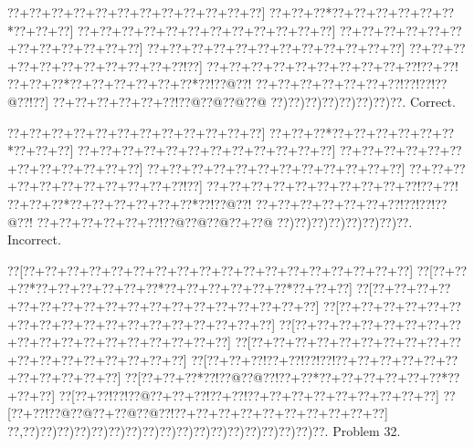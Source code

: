 \documentclass[a5paper]{article}
\begin{document}
\begin{center}
{\goo
\0??+\0??+\0??+\0??+\0??+\0??+\0??+\0??+\0??+\0??+\0??+\0??]
\0??+\0??+\0??*\0??+\0??+\0??+\0??+\0??+\0??*\0??+\0??+\0??]
\0??+\0??+\0??+\0??+\0??+\0??+\0??+\0??+\0??+\0??+\0??+\0??]
\0??+\0??+\0??+\0??+\0??+\0??+\0??+\0??+\0??+\0??+\0??+\0??]
\0??+\0??+\0??+\0??+\0??+\0??+\0??+\0??+\0??+\0??+\0??+\0??]
\0??+\0??+\0??+\0??+\0??+\0??+\0??+\0??+\0??+\0??+\0??!\0??]
\0??+\0??+\0??+\0??+\0??+\0??+\0??+\0??+\0??+\0??!\0??+\0??!
\0??+\0??+\0??*\0??+\0??+\0??+\0??+\0??+\0??*\0??!\0??@\0??!
\0??+\0??+\0??+\0??+\0??+\0??+\0??!\0??!\0??!\0??@\0??!\0??]
\0??+\0??+\0??+\0??+\0??+\0??!\0??@\0??@\0??@\0??@
\0??)\0??)\0??)\0??)\0??)\0??)\0??)\0??.
}
Correct. 

\end{center}
\begin{center}
{\goo
\0??+\0??+\0??+\0??+\0??+\0??+\0??+\0??+\0??+\0??+\0??+\0??]
\0??+\0??+\0??*\0??+\0??+\0??+\0??+\0??+\0??*\0??+\0??+\0??]
\0??+\0??+\0??+\0??+\0??+\0??+\0??+\0??+\0??+\0??+\0??+\0??]
\0??+\0??+\0??+\0??+\0??+\0??+\0??+\0??+\0??+\0??+\0??+\0??]
\0??+\0??+\0??+\0??+\0??+\0??+\0??+\0??+\0??+\0??+\0??+\0??]
\0??+\0??+\0??+\0??+\0??+\0??+\0??+\0??+\0??+\0??+\0??!\0??]
\0??+\0??+\0??+\0??+\0??+\0??+\0??+\0??+\0??+\0??!\0??+\0??!
\0??+\0??+\0??*\0??+\0??+\0??+\0??+\0??+\0??*\0??!\0??@\0??!
\0??+\0??+\0??+\0??+\0??+\0??+\0??!\0??!\0??!\0??@\0??!
\0??+\0??+\0??+\0??+\0??+\0??!\0??@\0??@\0??@\0??+\0??@
\0??)\0??)\0??)\0??)\0??)\0??)\0??)\0??.
}
Incorrect. 

\end{center}
\newpage
\begin{center}
{\goo
\0??[\0??+\0??+\0??+\0??+\0??+\0??+\0??+\0??+\0??+\0??+\0??+\0??+\0??+\0??+\0??+\0??+\0??+\0??]
\0??[\0??+\0??+\0??*\0??+\0??+\0??+\0??+\0??+\0??*\0??+\0??+\0??+\0??+\0??+\0??*\0??+\0??+\0??]
\0??[\0??+\0??+\0??+\0??+\0??+\0??+\0??+\0??+\0??+\0??+\0??+\0??+\0??+\0??+\0??+\0??+\0??+\0??]
\0??[\0??+\0??+\0??+\0??+\0??+\0??+\0??+\0??+\0??+\0??+\0??+\0??+\0??+\0??+\0??+\0??+\0??+\0??]
\0??[\0??+\0??+\0??+\0??+\0??+\0??+\0??+\0??+\0??+\0??+\0??+\0??+\0??+\0??+\0??+\0??+\0??+\0??]
\0??[\0??+\0??+\0??+\0??+\0??+\0??+\0??+\0??+\0??+\0??+\0??+\0??+\0??+\0??+\0??+\0??+\0??+\0??]
\0??[\0??+\0??+\0??!\0??+\0??!\0??!\0??!\0??+\0??+\0??+\0??+\0??+\0??+\0??+\0??+\0??+\0??+\0??]
\0??[\0??+\0??+\0??*\0??!\0??@\0??@\0??!\0??+\0??*\0??+\0??+\0??+\0??+\0??+\0??*\0??+\0??+\0??]
\0??[\0??+\0??!\0??!\0??@\0??+\0??+\0??!\0??+\0??!\0??+\0??+\0??+\0??+\0??+\0??+\0??+\0??+\0??]
\0??[\0??+\0??!\0??@\0??@\0??+\0??@\0??@\0??!\0??+\0??+\0??+\0??+\0??+\0??+\0??+\0??+\0??+\0??]
\0??,\0??)\0??)\0??)\0??)\0??)\0??)\0??)\0??)\0??)\0??)\0??)\0??)\0??)\0??)\0??)\0??)\0??)\0??.
}
Problem 32.

\end{center}
\end{document}
